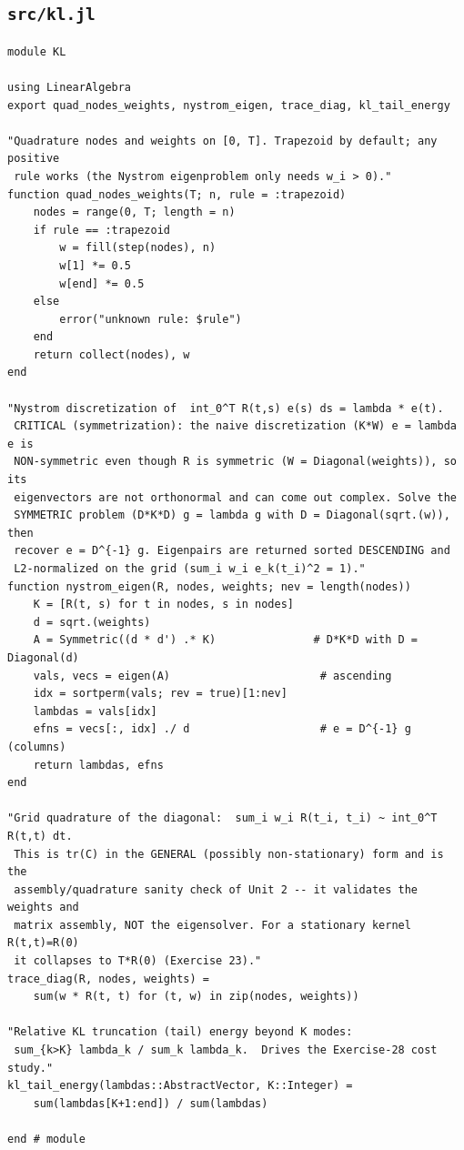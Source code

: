 \documentclass[11pt]{article}
\begin{document}
\subsection*{\texttt{src/kl.jl}}
\begin{lstlisting}
module KL

using LinearAlgebra
export quad_nodes_weights, nystrom_eigen, trace_diag, kl_tail_energy

"Quadrature nodes and weights on [0, T]. Trapezoid by default; any positive
 rule works (the Nystrom eigenproblem only needs w_i > 0)."
function quad_nodes_weights(T; n, rule = :trapezoid)
    nodes = range(0, T; length = n)
    if rule == :trapezoid
        w = fill(step(nodes), n)
        w[1] *= 0.5
        w[end] *= 0.5
    else
        error("unknown rule: $rule")
    end
    return collect(nodes), w
end

"Nystrom discretization of  int_0^T R(t,s) e(s) ds = lambda * e(t).
 CRITICAL (symmetrization): the naive discretization (K*W) e = lambda e is
 NON-symmetric even though R is symmetric (W = Diagonal(weights)), so its
 eigenvectors are not orthonormal and can come out complex. Solve the
 SYMMETRIC problem (D*K*D) g = lambda g with D = Diagonal(sqrt.(w)), then
 recover e = D^{-1} g. Eigenpairs are returned sorted DESCENDING and
 L2-normalized on the grid (sum_i w_i e_k(t_i)^2 = 1)."
function nystrom_eigen(R, nodes, weights; nev = length(nodes))
    K = [R(t, s) for t in nodes, s in nodes]
    d = sqrt.(weights)
    A = Symmetric((d * d') .* K)               # D*K*D with D = Diagonal(d)
    vals, vecs = eigen(A)                       # ascending
    idx = sortperm(vals; rev = true)[1:nev]
    lambdas = vals[idx]
    efns = vecs[:, idx] ./ d                    # e = D^{-1} g (columns)
    return lambdas, efns
end

"Grid quadrature of the diagonal:  sum_i w_i R(t_i, t_i) ~ int_0^T R(t,t) dt.
 This is tr(C) in the GENERAL (possibly non-stationary) form and is the
 assembly/quadrature sanity check of Unit 2 -- it validates the weights and
 matrix assembly, NOT the eigensolver. For a stationary kernel R(t,t)=R(0)
 it collapses to T*R(0) (Exercise 23)."
trace_diag(R, nodes, weights) =
    sum(w * R(t, t) for (t, w) in zip(nodes, weights))

"Relative KL truncation (tail) energy beyond K modes:
 sum_{k>K} lambda_k / sum_k lambda_k.  Drives the Exercise-28 cost study."
kl_tail_energy(lambdas::AbstractVector, K::Integer) =
    sum(lambdas[K+1:end]) / sum(lambdas)

end # module
\end{lstlisting}
\end{document}
